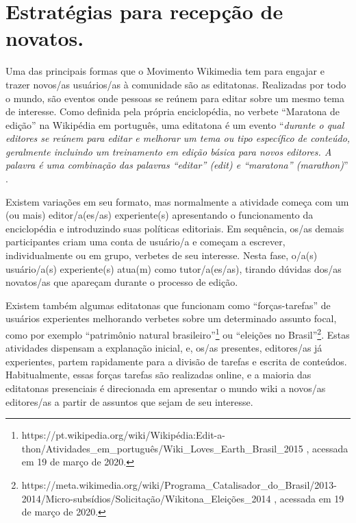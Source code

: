 \section{Estratégias para recepção de novatos.}

Uma das principais formas que o Movimento Wikimedia tem para engajar e trazer novos/as usuários/as à comunidade são as editatonas. Realizadas por todo o mundo, são eventos onde pessoas se reúnem para editar sobre um mesmo tema de interesse. Como definida pela própria enciclopédia, no verbete ``Maratona de edição'' na Wikipédia em português, uma editatona é um evento ``\textit{durante o qual editores se reúnem para editar e melhorar um tema ou tipo específico de conteúdo, geralmente incluindo um treinamento em edição básica para novos editores. A palavra é uma combinação das palavras ``editar'' (\textit{edit}) e ``maratona'' (\textit{marathon})}'' .

Existem variações em seu formato, mas normalmente a atividade começa com um (ou mais) editor/a(es/as) experiente(s) apresentando o funcionamento da enciclopédia e introduzindo suas políticas editoriais. Em sequência, os/as demais participantes criam uma conta de usuário/a e começam a escrever, individualmente ou em grupo, verbetes de seu interesse. Nesta fase, o/a(s) usuário/a(s) experiente(s) atua(m) como tutor/a(es/as), tirando dúvidas dos/as novatos/as que apareçam durante o processo de edição.

Existem também algumas editatonas que funcionam como ``forças-tarefas'' de usuários experientes melhorando verbetes sobre um determinado assunto focal, como por exemplo ``patrimônio natural brasileiro''\footnote{https://pt.wikipedia.org/wiki/Wikipédia:Edit-a-thon/Atividades\_em\_português/Wiki\_Loves\_Earth\_Brasil\_2015 , acessada em 19 de março de 2020.} ou ``eleições no Brasil''\footnote{https://meta.wikimedia.org/wiki/Programa\_Catalisador\_do\_Brasil/2013-2014/Micro-subsídios/Solicitação/Wikitona\_Eleições\_2014 , acessada em 19 de março de 2020.}. Estas atividades dispensam a explanação inicial, e, os/as presentes, editores/as já experientes, partem rapidamente para a divisão de tarefas e escrita de conteúdos. Habitualmente, essas forças tarefas são realizadas online, e a maioria das editatonas presenciais é direcionada em apresentar o mundo wiki a novos/as editores/as a partir de assuntos que sejam de seu interesse.

